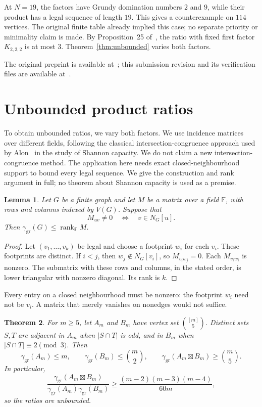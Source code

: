 \documentclass[screen]{aomart}
\newtheorem{theorem}{Theorem}[section]
\newtheorem{lemma}[theorem]{Lemma}
\theoremstyle{definition}
\theoremstyle{remark}
\numberwithin{equation}{section}
\newcommand{\ggr}{\gamma_{\mathrm{gr}}}
\newcommand{\sprod}{\boxtimes}
\newcommand{\oct}{K_{2,2,2}}
\begin{document}
At $N=19$, the factors have Grundy domination numbers $2$ and $9$, while their product has a legal sequence of length $19$. This gives a counterexample on $114$ vertices. The original finite table already implied this case; no separate priority or minimality claim is made. By Proposition~25 of~\cite{BBG}, the ratio with fixed first factor $\oct$ is at most $3$. Theorem~\ref{thm:unbounded} varies both factors.


The original preprint is available at~\cite{Preprint}; this submission revision and its verification files are available at~\cite{Revision}.

\section{Unbounded product ratios}\label{sec:unbounded}

To obtain unbounded ratios, we vary both factors. We use incidence matrices over different fields, following the classical intersection-congruence approach used by Alon~\cite[Section~3]{Alon} in the study of Shannon capacity. We do not claim a new intersection-congruence method. The application here needs exact closed-neighbourhood support to bound every legal sequence. We give the construction and rank argument in full; no theorem about Shannon capacity is used as a premise.

\begin{lemma}\label{lem:rank}
Let $G$ be a finite graph and let $M$ be a matrix over a field $\mathbb F$, with rows and columns indexed by $V(G)$. Suppose that
\[
 M_{uv}\ne0\quad\Longleftrightarrow\quad v\in N_G[u].
\]
Then $\ggr(G)\le\operatorname{rank}_{\mathbb F}M$.
\end{lemma}

\begin{proof}
Let $(v_1,\dots,v_k)$ be legal and choose a footprint $w_i$ for each $v_i$. These footprints are distinct. If $i<j$, then $w_j\notin N_G[v_i]$, so $M_{v_iw_j}=0$. Each $M_{v_iw_i}$ is nonzero. The submatrix with these rows and columns, in the stated order, is lower triangular with nonzero diagonal. Its rank is $k$.
\end{proof}

Every entry on a closed neighbourhood must be nonzero: the footprint $w_i$ need not be $v_i$. A matrix that merely vanishes on nonedges would not suffice.

\begin{theorem}\label{thm:two-fields}
For $m\ge5$, let $A_m$ and $B_m$ have vertex set $\binom{[m]}5$. Distinct sets $S,T$ are adjacent in $A_m$ when $|S\cap T|$ is odd, and in $B_m$ when $|S\cap T|\equiv2\pmod3$. Then
\[
 \ggr(A_m)\le m,\qquad \ggr(B_m)\le\binom m2,\qquad
 \ggr(A_m\sprod B_m)\ge\binom m5.
\]
In particular,
\begin{equation}\label{eq:unbounded-ratio}
 \frac{\ggr(A_m\sprod B_m)}{\ggr(A_m)\ggr(B_m)}
 \ge\frac{(m-2)(m-3)(m-4)}{60m},
\end{equation}
so the ratios are unbounded.
\end{theorem}
\end{document}
